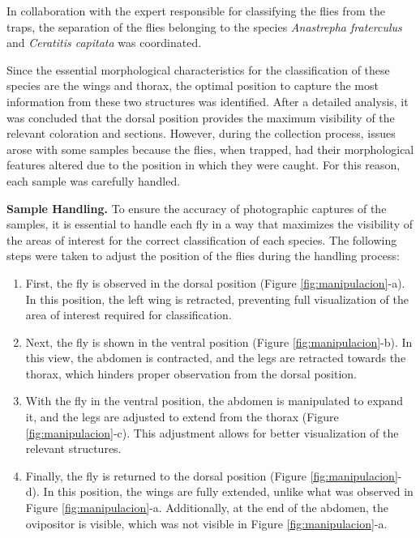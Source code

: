 In collaboration with the expert responsible for classifying the flies from the traps, the separation of the flies belonging to the species \textit{Anastrepha fraterculus} and \textit{Ceratitis capitata} was coordinated.

Since the essential morphological characteristics for the classification of these species are the wings and thorax, the optimal position to capture the most information from these two structures was identified. After a detailed analysis, it was concluded that the dorsal position provides the maximum visibility of the relevant coloration and sections. However, during the collection process, issues arose with some samples because the flies, when trapped, had their morphological features altered due to the position in which they were caught. For this reason, each sample was carefully handled.

\textbf{Sample Handling.}
To ensure the accuracy of photographic captures of the samples, it is essential to handle each fly in a way that maximizes the visibility of the areas of interest for the correct classification of each species. The following steps were taken to adjust the position of the flies during the handling process:

\begin{enumerate}
	\item First, the fly is observed in the dorsal position (Figure \ref{fig:manipulacion}-a). In this position, the left wing is retracted, preventing full visualization of the area of interest required for classification.
	\item Next, the fly is shown in the ventral position (Figure \ref{fig:manipulacion}-b). In this view, the abdomen is contracted, and the legs are retracted towards the thorax, which hinders proper observation from the dorsal position.
	\item With the fly in the ventral position, the abdomen is manipulated to expand it, and the legs are adjusted to extend from the thorax (Figure \ref{fig:manipulacion}-c). This adjustment allows for better visualization of the relevant structures.
	\item Finally, the fly is returned to the dorsal position (Figure \ref{fig:manipulacion}-d). In this position, the wings are fully extended, unlike what was observed in Figure \ref{fig:manipulacion}-a. Additionally, at the end of the abdomen, the ovipositor is visible, which was not visible in Figure \ref{fig:manipulacion}-a.
\end{enumerate}

